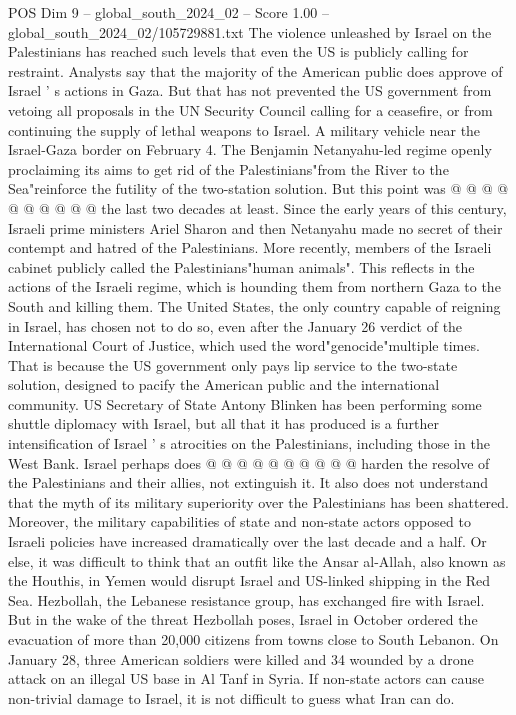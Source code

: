 \begin{textsample}{POS Dim 9 – global\_south\_2024\_02 – Score 1.00 – global\_south\_2024\_02/105729881.txt}
The violence unleashed by Israel on the Palestinians has reached such levels that even the US is publicly calling for restraint.
Analysts say that the majority of the American public does approve of Israel ' s actions in Gaza.
But that has not prevented the US government from vetoing all proposals in the UN Security Council calling for a ceasefire, or from continuing the supply of lethal weapons to Israel.
A military vehicle near the Israel-Gaza border on February 4.
The Benjamin Netanyahu-led regime openly proclaiming its aims to get rid of the Palestinians"from the River to the Sea"reinforce the futility of the two-station solution.
But this point was @ @ @ @ @ @ @ @ @ @ the last two decades at least.
Since the early years of this century, Israeli prime ministers Ariel Sharon and then Netanyahu made no secret of their contempt and hatred of the Palestinians.
More recently, members of the Israeli cabinet publicly called the Palestinians"human animals".
This reflects in the actions of the Israeli regime, which is hounding them from northern Gaza to the South and killing them.
The United States, the only country capable of reigning in Israel, has chosen not to do so, even after the January 26 verdict of the International Court of Justice, which used the word"genocide"multiple times.
That is because the US government only pays lip service to the two-state solution, designed to pacify the American public and the international community.
US Secretary of State Antony Blinken has been performing some shuttle diplomacy with Israel, but all that it has produced is a further intensification of Israel ' s atrocities on the Palestinians, including those in the West Bank.
Israel perhaps does @ @ @ @ @ @ @ @ @ @ harden the resolve of the Palestinians and their allies, not extinguish it.
It also does not understand that the myth of its military superiority over the Palestinians has been shattered.
Moreover, the military capabilities of state and non-state actors opposed to Israeli policies have increased dramatically over the last decade and a half.
Or else, it was difficult to think that an outfit like the Ansar al-Allah, also known as the Houthis, in Yemen would disrupt Israel and US-linked shipping in the Red Sea.
Hezbollah, the Lebanese resistance group, has exchanged fire with Israel.
But in the wake of the threat Hezbollah poses, Israel in October ordered the evacuation of more than 20,000 citizens from towns close to South Lebanon.
On January 28, three American soldiers were killed and 34 wounded by a drone attack on an illegal US base in Al Tanf in Syria.
If non-state actors can cause non-trivial damage to Israel, it is not difficult to guess what Iran can do.

\end{textsample}
